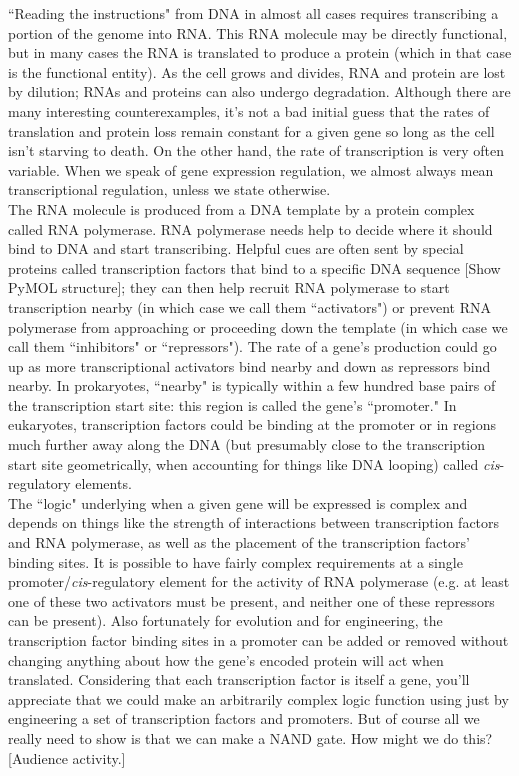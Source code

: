 \documentclass{article}
\begin{document}
``Reading the instructions" from DNA in almost all cases requires transcribing a portion of the genome into RNA. This RNA molecule may be directly functional, but in many cases the RNA is translated to produce a protein (which in that case is the functional entity). As the cell grows and divides, RNA and protein are lost by dilution; RNAs and proteins can also undergo degradation. Although there are many interesting counterexamples, it's not a bad initial guess that the rates of translation and protein loss remain constant for a given gene so long as the cell isn't starving to death. On the other hand, the rate of transcription is very often variable. When we speak of gene expression regulation, we almost always mean transcriptional regulation, unless we state otherwise.\\

The RNA molecule is produced from a DNA template by a protein complex called RNA polymerase. RNA polymerase needs help to decide where it should bind to DNA and start transcribing. Helpful cues are often sent by special proteins called transcription factors that bind to a specific DNA sequence [Show PyMOL structure]; they can then help recruit RNA polymerase to start transcription nearby (in which case we call them ``activators") or prevent RNA polymerase from approaching or proceeding down the template (in which case we call them ``inhibitors" or ``repressors"). The rate of a gene's production could go up as more transcriptional activators bind nearby and down as repressors bind nearby. In prokaryotes, ``nearby" is typically within a few hundred base pairs of the transcription start site: this region is called the gene's ``promoter." In eukaryotes, transcription factors could be binding at the promoter or in regions much further away along the DNA (but presumably close to the transcription start site geometrically, when accounting for things like DNA looping) called \textit{cis}-regulatory elements.\\

The ``logic" underlying when a given gene will be expressed is complex and depends on things like the strength of interactions between transcription factors and RNA polymerase, as well as the placement of the transcription factors' binding sites. It is possible to have fairly complex requirements at a single promoter/\textit{cis}-regulatory element for the activity of RNA polymerase (e.g. at least one of these two activators must be present, and neither one of these repressors can be present). Also fortunately for evolution and for engineering, the transcription factor binding sites in a promoter can be added or removed without changing anything about how the gene's encoded protein will act when translated. Considering that each transcription factor is itself a gene, you'll appreciate that we could make an arbitrarily complex logic function using just by engineering a set of transcription factors and promoters. But of course all we really need to show is that we can make a NAND gate. How might we do this? [Audience activity.]
\end{document}
